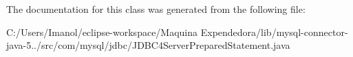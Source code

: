 The documentation for this class was generated from the following file\+:\begin{DoxyCompactItemize}
\item 
C\+:/\+Users/\+Imanol/eclipse-\/workspace/\+Maquina Expendedora/lib/mysql-\/connector-\/java-\/5../src/com/mysql/jdbc/J\+D\+B\+C4\+Server\+Prepared\+Statement.\+java\end{DoxyCompactItemize}
